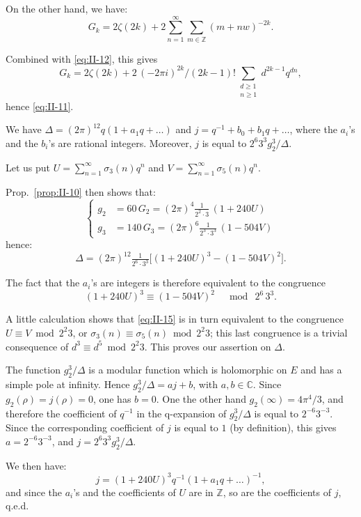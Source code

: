 On the other hand, we have:
\[
G_{k}=2\zeta(2k)+2\sum_{n=1}^{\infty}\sum_{m\in\mathbb{Z}}(m+nw)^{-2k}.
\tag{12}\label{eq:II-12}
\]

Combined with \eqref{eq:II-12}, this gives
\[
G_{k}=2\zeta(2k)+2\,(-2\pi i)^{2k}/(2k-1)!
\sum_{\substack{d\geq 1\\ n\geq 1}}d^{2k-1}q^{dn},
\]
hence \eqref{eq:II-11}.

\begin{proposition}\label{prop:II-11}
We have $\Delta=(2\pi)^{12}q(1+a_{1}q+\dots)$ and
$j=q^{-1}+b_{0}+b_{1}q+\dots$, where the $a_{i}$'s and the $b_{i}$'s are
rational integers. Moreover, $j$ is equal to $2^{6}3^{3}g_{2}^{3}/\Delta$.
\end{proposition}

Let us put $U=\sum_{n=1}^{\infty}\sigma_{3}(n)q^{n}$ and
$V=\sum_{n=1}^{\infty}\sigma_{5}(n)q^{n}$.

Prop.~\ref{prop:II-10} then shows that:
\[
\left\{
\begin{aligned}
g_{2}&=60\,G_{2}=(2\pi)^{4}\tfrac{1}{2^{2}\cdot 3}\,(1+240U)\\
g_{3}&=140\,G_{3}=(2\pi)^{6}\tfrac{1}{2^{3}\cdot 3^{3}}\,(1-504V)
\end{aligned}\right.
\tag{13}\label{eq:II-13}
\]
hence:
\[
\Delta=(2\pi)^{12}\tfrac{1}{2^{6}\cdot 3^{3}}
\bigl[(1+240U)^{3}-(1-504V)^{2}\bigr].
\tag{14}\label{eq:II-14}
\]

The fact that the $a_{i}$'s are integers is therefore equivalent to the
congruence
\[
(1+240U)^{3}\equiv(1-504V)^{2}\quad\bmod\ 2^{6}\,3^{3}.
\tag{15}\label{eq:II-15}
\]

A little calculation shows that \eqref{eq:II-15} is in turn equivalent to
the congruence $U\equiv V\bmod 2^{2}3$, or
$\sigma_{3}(n)\equiv\sigma_{5}(n)\bmod 2^{2}3$; this last congruence is a
trivial consequence of $d^{3}\equiv d^{5}\bmod 2^{2}3$. This proves our
assertion on $\Delta$.

The function $g_{2}^{3}/\Delta$ is a modular function which is holomorphic
on $E$ and has a simple pole at infinity. Hence
$g_{2}^{3}/\Delta=aj+b$, with $a,b\in\mathbb{C}$. Since
$g_{2}(\rho)=j(\rho)=0$, one has $b=0$. One the other hand
$g_{2}(\infty)=4\pi^{4}/3$, and therefore the coefficient of $q^{-1}$ in
the q-expansion of $g_{2}^{3}/\Delta$ is equal to $2^{-6}3^{-3}$. Since
the corresponding coefficient of $j$ is equal to $1$ (by definition), this
gives $a=2^{-6}3^{-3}$, and $j=2^{6}3^{3}g_{2}^{3}/\Delta$.

We then have:
\[
j=(1+240U)^{3}q^{-1}(1+a_{1}q+\dots)^{-1},
\]
and since the $a_{i}$'s and the coefficients of $U$ are in
$\mathbb{Z}$, so are the coefficients of $j$, q.e.d.

